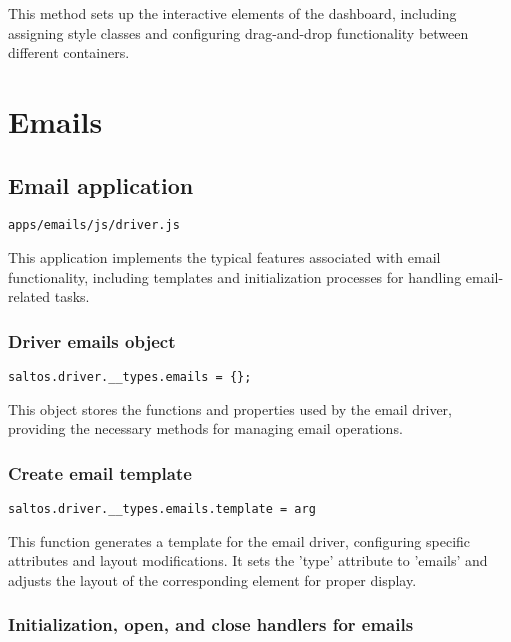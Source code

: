 \documentclass[a4paper]{article}
\begin{document}
This method sets up the interactive elements of the dashboard, including assigning style classes
and configuring drag-and-drop functionality between different containers.


\hypertarget{toc44}{}
\section{Emails}

\hypertarget{toc45}{}
\subsection{Email application}

\begin{lstlisting}
apps/emails/js/driver.js
\end{lstlisting}

This application implements the typical features associated with email functionality,
including templates and initialization processes for handling email-related tasks.

\hypertarget{toc46}{}
\subsubsection{Driver emails object}

\begin{lstlisting}
saltos.driver.__types.emails = {};
\end{lstlisting}

This object stores the functions and properties used by the email driver,
providing the necessary methods for managing email operations.

\hypertarget{toc47}{}
\subsubsection{Create email template}

\begin{lstlisting}
saltos.driver.__types.emails.template = arg
\end{lstlisting}

This function generates a template for the email driver, configuring specific
attributes and layout modifications. It sets the 'type' attribute to 'emails'
and adjusts the layout of the corresponding element for proper display.

\hypertarget{toc48}{}
\subsubsection{Initialization, open, and close handlers for emails}
\end{document}
